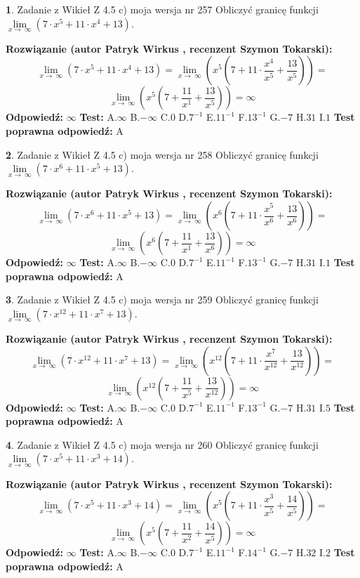\documentclass[12pt, a4paper]{article}
\theoremstyle{definition} %
\newtheorem{zad}{}
\newcommand{\zadStart}[1]{\begin{zad}#1\newline}
\newcommand{\zadStop}{\end{zad}}
\newcommand{\rozwStart}[2]{\noindent \textbf{Rozwiązanie (autor #1 , recenzent #2): }\newline}
\newcommand{\rozwStop}{\newline}
\newcommand{\odpStart}{\noindent \textbf{Odpowiedź:}\newline}
\newcommand{\odpStop}{\newline}
\newcommand{\testStart}{\noindent \textbf{Test:}\newline}
\newcommand{\testStop}{\newline}
\newcommand{\kluczStart}{\noindent \textbf{Test poprawna odpowiedź:}\newline}
\newcommand{\kluczStop}{\newline}
\begin{document}
\zadStart{Zadanie z Wikieł Z 4.5 c) moja wersja nr 257}
Obliczyć granicę funkcji  $\lim\limits_{x\to\ \infty}(7 \cdot x^{5}+11 \cdot x^{4}+13)$.
\zadStop
\rozwStart{Patryk Wirkus}{Szymon Tokarski}
$$\lim\limits_{x\to\ \infty}(7 \cdot x^{5}+11 \cdot x^{4}+13) = \lim\limits_{x\to\ \infty}(x^{5}(7 +11 \cdot \frac{x^{4}}{x^{5}}+\frac{13}{x^{5}})) =$$ $$\lim\limits_{x\to\ \infty}(x^{5}(7 +\frac{11}{x^{1}}+\frac{13}{x^{5}})) =\infty$$
\rozwStop
\odpStart
$\infty$
\odpStop
\testStart
A.$\infty$ B.$-\infty$ C.$0$ D.$7^{-1}$ E.$11^{-1}$
F.$13^{-1}$ G.$-7$
H.$31$
I.$1$
\testStop
\kluczStart
A
\kluczStop



\zadStart{Zadanie z Wikieł Z 4.5 c) moja wersja nr 258}
Obliczyć granicę funkcji  $\lim\limits_{x\to\ \infty}(7 \cdot x^{6}+11 \cdot x^{5}+13)$.
\zadStop
\rozwStart{Patryk Wirkus}{Szymon Tokarski}
$$\lim\limits_{x\to\ \infty}(7 \cdot x^{6}+11 \cdot x^{5}+13) = \lim\limits_{x\to\ \infty}(x^{6}(7 +11 \cdot \frac{x^{5}}{x^{6}}+\frac{13}{x^{6}})) =$$ $$\lim\limits_{x\to\ \infty}(x^{6}(7 +\frac{11}{x^{1}}+\frac{13}{x^{6}})) =\infty$$
\rozwStop
\odpStart
$\infty$
\odpStop
\testStart
A.$\infty$ B.$-\infty$ C.$0$ D.$7^{-1}$ E.$11^{-1}$
F.$13^{-1}$ G.$-7$
H.$31$
I.$1$
\testStop
\kluczStart
A
\kluczStop



\zadStart{Zadanie z Wikieł Z 4.5 c) moja wersja nr 259}
Obliczyć granicę funkcji  $\lim\limits_{x\to\ \infty}(7 \cdot x^{12}+11 \cdot x^{7}+13)$.
\zadStop
\rozwStart{Patryk Wirkus}{Szymon Tokarski}
$$\lim\limits_{x\to\ \infty}(7 \cdot x^{12}+11 \cdot x^{7}+13) = \lim\limits_{x\to\ \infty}(x^{12}(7 +11 \cdot \frac{x^{7}}{x^{12}}+\frac{13}{x^{12}})) =$$ $$\lim\limits_{x\to\ \infty}(x^{12}(7 +\frac{11}{x^{5}}+\frac{13}{x^{12}})) =\infty$$
\rozwStop
\odpStart
$\infty$
\odpStop
\testStart
A.$\infty$ B.$-\infty$ C.$0$ D.$7^{-1}$ E.$11^{-1}$
F.$13^{-1}$ G.$-7$
H.$31$
I.$5$
\testStop
\kluczStart
A
\kluczStop



\zadStart{Zadanie z Wikieł Z 4.5 c) moja wersja nr 260}
Obliczyć granicę funkcji  $\lim\limits_{x\to\ \infty}(7 \cdot x^{5}+11 \cdot x^{3}+14)$.
\zadStop
\rozwStart{Patryk Wirkus}{Szymon Tokarski}
$$\lim\limits_{x\to\ \infty}(7 \cdot x^{5}+11 \cdot x^{3}+14) = \lim\limits_{x\to\ \infty}(x^{5}(7 +11 \cdot \frac{x^{3}}{x^{5}}+\frac{14}{x^{5}})) =$$ $$\lim\limits_{x\to\ \infty}(x^{5}(7 +\frac{11}{x^{2}}+\frac{14}{x^{5}})) =\infty$$
\rozwStop
\odpStart
$\infty$
\odpStop
\testStart
A.$\infty$ B.$-\infty$ C.$0$ D.$7^{-1}$ E.$11^{-1}$
F.$14^{-1}$ G.$-7$
H.$32$
I.$2$
\testStop
\kluczStart
A
\kluczStop
\end{document}
